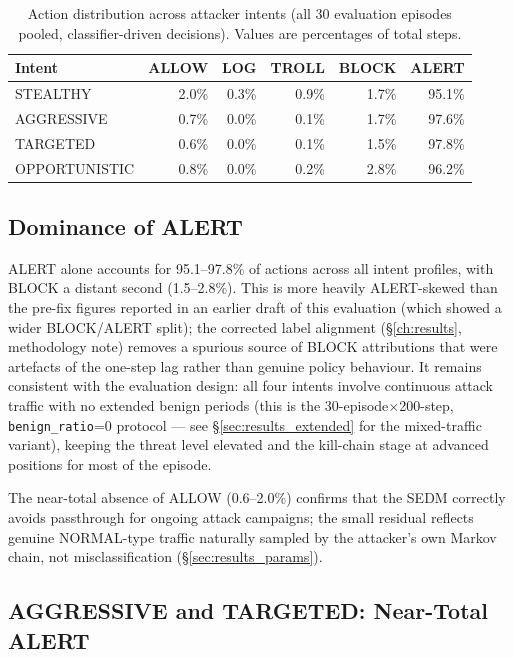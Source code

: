 \begin{table}[ht]
  \centering
  \caption{Action distribution across attacker intents (all 30 evaluation
           episodes pooled, classifier-driven decisions).
           Values are percentages of total steps.}
  \label{tab:action_dist}
  \begin{tabular}{lrrrrr}
    \toprule
    Intent & ALLOW & LOG & TROLL & BLOCK & ALERT \\
    \midrule
    STEALTHY      & 2.0\% & 0.3\% & 0.9\% & 1.7\% & 95.1\% \\
    AGGRESSIVE    & 0.7\% & 0.0\% & 0.1\% & 1.7\% & 97.6\% \\
    TARGETED      & 0.6\% & 0.0\% & 0.1\% & 1.5\% & 97.8\% \\
    OPPORTUNISTIC & 0.8\% & 0.0\% & 0.2\% & 2.8\% & 96.2\% \\
    \bottomrule
  \end{tabular}
\end{table}

\subsection{Dominance of ALERT}

ALERT alone accounts for 95.1--97.8\% of actions across all intent profiles,
with BLOCK a distant second (1.5--2.8\%). This is more heavily ALERT-skewed
than the pre-fix figures reported in an earlier draft of this evaluation
(which showed a wider BLOCK/ALERT split); the corrected label alignment
(\S\ref{ch:results}, methodology note) removes a spurious source of BLOCK
attributions that were artefacts of the one-step lag rather than genuine
policy behaviour. It remains consistent with the evaluation design: all
four intents involve continuous attack traffic with no extended benign
periods (this is the 30-episode$\times$200-step, \texttt{benign\_ratio}=0
protocol — see \S\ref{sec:results_extended} for the mixed-traffic variant),
keeping the threat level elevated and the kill-chain stage at advanced
positions for most of the episode.

The near-total absence of ALLOW (0.6--2.0\%) confirms that the SEDM
correctly avoids passthrough for ongoing attack campaigns; the small
residual reflects genuine NORMAL-type traffic naturally sampled by the
attacker's own Markov chain, not misclassification (\S\ref{sec:results_params}).

\subsection{AGGRESSIVE and TARGETED: Near-Total ALERT}

